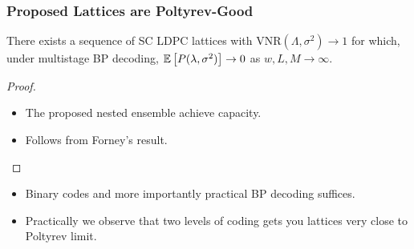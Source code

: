 \documentclass[10pt]{beamer}
\begin{document}
\begin{frame}\frametitle{Proposed Lattices are Poltyrev-Good}
\begin{theorem}
There exists a sequence of SC LDPC lattices with VNR$(\Lambda,\sigma^{2})\rightarrow 1$ for which, under multistage BP decoding, $\mathbb{E}\left[P(\lambda,\sigma^{2})\right]\rightarrow 0$ as $w,L,M  \rightarrow \infty$.
\end{theorem}    
\begin{proof}
\begin{itemize}
\item The proposed nested ensemble achieve capacity.
\item Follows from Forney's result.
\end{itemize}

\end{proof}
\vspace{0.3in}
\pause
\begin{itemize}
        \item {\blue Binary codes} and more importantly {\blue practical BP decoding} suffices. 
        \item Practically we observe that {\blue two levels} of coding gets you lattices very close to Poltyrev limit.
    \end{itemize}
\end{frame}
	
\end{document}
